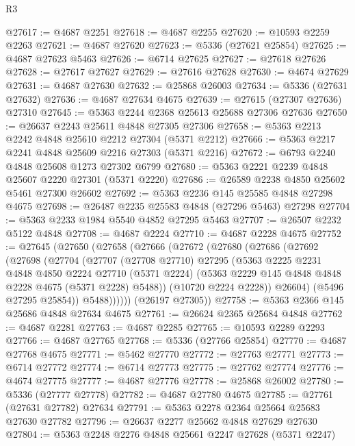 \begin{lexlean}{R3}
\begin{coremodule}
@27617 := @4687 @2251
@27618 := @4687 @2255
@27620 := @10593 @2259 @2263
@27621 := @4687 @27620
@27623 := @5336 (@27621 @25854)
@27625 := @4687 @27623 @5463
@27626 := @6714 @27625
@27627 := @27618 @27626
@27628 := @27617 @27627
@27629 := @27616 @27628
@27630 := @4674 @27629
@27631 := @4687 @27630
@27632 := @25868 @26003
@27634 := @5336 (@27631 @27632)
@27636 := @4687 @27634 @4675
@27639 := @27615 (@27307 @27636) @27310
@27645 := @5363 @2244 @2368 @25613 @25688 @27306 @27636
@27650 := @26637 @2243 @25611 @4848 @27305 @27306
@27658 := @5363 @2213 @2242 @4848 @25610 @2212 @27304 (@5371 @2212)
@27666 := @5363 @2217 @2241 @4848 @25609 @2216 @27303 (@5371 @2216)
@27672 := @6793 @2240 @4848 @25608 @1273 @27302 @6799
@27680 := @5363 @2221 @2239 @4848 @25607 @2220 @27301 (@5371 @2220)
@27686 := @26589 @2238 @4850 @25602 @5461 @27300 @26602
@27692 := @5363 @2236 @145 @25585 @4848 @27298 @4675
@27698 := @26487 @2235 @25583 @4848 (@27296 @5463) @27298
@27704 := @5363 @2233 @1984 @5540 @4852 @27295 @5463
@27707 := @26507 @2232 @5122 @4848
@27708 := @4687 @2224
@27710 := @4687 @2228 @4675
@27752 := @27645
    (@27650
      (@27658
        (@27666
          (@27672
            (@27680
              (@27686
                (@27692
                  (@27698
                    (@27704
                      (@27707
                        (@27708 @27710)
                        @27295
                        (@5363
                          @2225
                          @2231
                          @4848
                          @4850
                          @2224
                          @27710
                          (@5371 @2224)
                          (@5363 @2229 @145 @4848 @4848 @2228 @4675 (@5371 @2228) @5488))
                        (@10720 @2224 @2228))
                      @26604)
                    (@5496 @27295 @25854))
                  @5488))))))
      (@26197 @27305))
@27758 := @5363 @2366 @145 @25686 @4848 @27634 @4675
@27761 := @26624 @2365 @25684 @4848
@27762 := @4687 @2281
@27763 := @4687 @2285
@27765 := @10593 @2289 @2293
@27766 := @4687 @27765
@27768 := @5336 (@27766 @25854)
@27770 := @4687 @27768 @4675
@27771 := @5462 @27770
@27772 := @27763 @27771
@27773 := @6714 @27772
@27774 := @6714 @27773
@27775 := @27762 @27774
@27776 := @4674 @27775
@27777 := @4687 @27776
@27778 := @25868 @26002
@27780 := @5336 (@27777 @27778)
@27782 := @4687 @27780 @4675
@27785 := @27761 (@27631 @27782) @27634
@27791 := @5363 @2278 @2364 @25664 @25683 @27630 @27782
@27796 := @26637 @2277 @25662 @4848 @27629 @27630
@27804 := @5363 @2248 @2276 @4848 @25661 @2247 @27628 (@5371 @2247)

\end{coremodule}
\end{lexlean}

